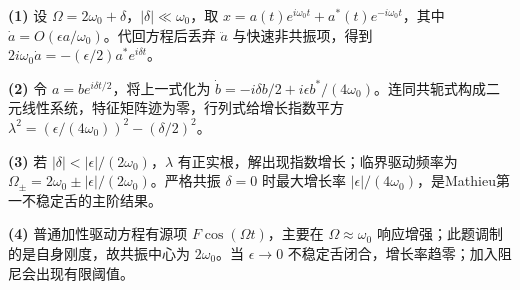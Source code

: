 \par\noindent\textbf{(1)} 设 \(\Omega=2\omega_0+\delta\)，\(|\delta|\ll\omega_0\)，取 \(x=a(t)e^{i\omega_0t}+a^*(t)e^{-i\omega_0t}\)，其中 \(\dot a=O(\epsilon a/\omega_0)\)。代回方程后丢弃 \(\ddot a\) 与快速非共振项，得到 \(2i\omega_0\dot a=-(\epsilon/2)a^*e^{i\delta t}\)。
\par\noindent\textbf{(2)} 令 \(a=b e^{i\delta t/2}\)，将上一式化为 \(\dot b=-i\delta b/2+i\epsilon b^*/(4\omega_0)\)。连同共轭式构成二元线性系统，特征矩阵迹为零，行列式给增长指数平方 \(\lambda^2=(\epsilon/(4\omega_0))^2-(\delta/2)^2\)。
\par\noindent\textbf{(3)} 若 \(|\delta|<|\epsilon|/(2\omega_0)\)，\(\lambda\) 有正实根，解出现指数增长；临界驱动频率为 \(\Omega_\pm=2\omega_0\pm|\epsilon|/(2\omega_0)\)。严格共振 \(\delta=0\) 时最大增长率 \(|\epsilon|/(4\omega_0)\)，是Mathieu第一不稳定舌的主阶结果。
\par\noindent\textbf{(4)} 普通加性驱动方程有源项 \(F\cos(\Omega t)\)，主要在 \(\Omega\approx\omega_0\) 响应增强；此题调制的是自身刚度，故共振中心为 \(2\omega_0\)。当 \(\epsilon\to0\) 不稳定舌闭合，增长率趋零；加入阻尼会出现有限阈值。
